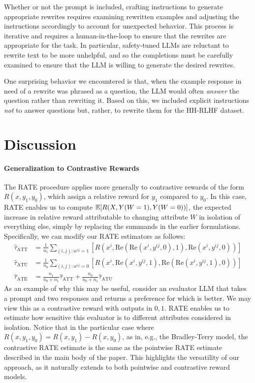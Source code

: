 \documentclass{article}
\begin{document}
Whether or not the prompt is included, crafting instructions to generate appropriate rewrites requires examining rewritten examples and adjusting the instructions accordingly to account for unexpected behavior. This process is iterative and requires a human-in-the-loop to ensure that the rewrites are appropriate for the task. In particular, safety-tuned LLMs are reluctant to rewrite text to be more unhelpful, and so the completions must be carefully examined to ensure that the LLM is willing to generate the desired rewrites.

One surprising behavior we encountered is that, when the example response in need of a rewrite was phrased as a question, the LLM would often \emph{answer} the question rather than rewriting it. Based on this, we included explicit instructions \emph{not} to answer questions but, rather, to rewrite them for the HH-RLHF dataset.

\section{Discussion}
\label{sec:discussion}

\paragraph{Generalization to Contrastive Rewards}
The RATE procedure applies more generally to contrastive rewards of the form $R(x, y_1, y_0)$, which assign a relative reward for $y_1$ compared to $y_0$. In this case, RATE enables us to compute $\mathbb{E}[R(X, Y(W=1), Y(W=0))]$, the expected increase in relative reward attributable to changing attribute $W$ in isolation of everything else, simply by replacing the summands in the earlier formulations. Specifically, we can modify our RATE estimators as follows:
\begin{align*}
  \hat{\tau}_{\text{ATT}} &= \frac{1}{n_1} \sum_{(i, j): w^{ij} = 1} [R(x^i, \text{Re}(\text{Re}(x^i, y^{ij}, 0), 1), \text{Re}(x^i, y^{ij}, 0))] \\
  \hat{\tau}_{\text{ATU}} &= \frac{1}{n_0} \sum_{(i,j): w^{ij} = 0} [R(x^i, \text{Re}(x^i, y^{ij}, 1), \text{Re}(\text{Re}(x^i, y^{ij}, 1), 0))] \\
  \hat{\tau}_{\text{ATE}} &= \frac{n_1}{n_0 + n_1} \hat{\tau}_{\text{ATT}} + \frac{n_0}{n_0 + n_1} \hat{\tau}_{\text{ATU}}
\end{align*}
As an example of why this may be useful, consider an evaluator LLM that takes a prompt and two responses and returns a preference for which is better. We may view this as a contrastive reward with outputs in ${0,1}$. RATE enables us to estimate how sensitive this evaluator is to different attributes considered in isolation. Notice that in the particular case where $R(x, y_1, y_0) = R(x, y_1) - R(x, y_0)$, as in, e.g., the Bradley-Terry model, the contrastive RATE estimate is the same as the pointwise RATE estimate described in the main body of the paper. This highlights the versatility of our approach, as it naturally extends to both pointwise and contrastive reward models.
\end{document}
